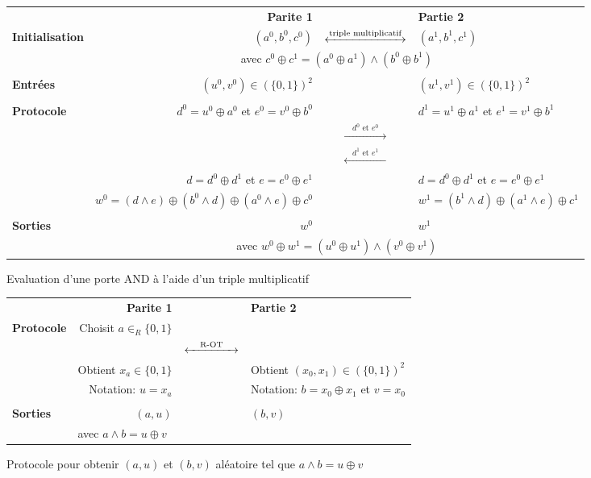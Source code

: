 \documentclass{article}
\begin{document}
\begin{figure}[h]
\centering
\begin{tabular}{|lrcl|}
\hline
 & \textbf{Parite 1} & & \textbf{Partie 2}\\
\textbf{Initialisation} & $(a^0 , b^0 , c^0)$ & $\xleftrightarrow{\text{triple multiplicatif}}$ & $(a^1 , b^1, c^1)$\\
 & \multicolumn{3}{c|}{avec $c^0 \oplus c^1 = (a^0 \oplus a^1) \land (b^0 \oplus b^1)$} \\
 & & & \\
\textbf{Entrées} & $(u^0, v^0) \in (\{0, 1\})^2$ & & $(u^1, v^1) \in (\{0, 1\})^2$ \\
 & & & \\
\textbf{Protocole} & $d^0 = u^0 \oplus a^0$ et $e^0 = v^0 \oplus b^0$ & & $d^1 = u^1 \oplus a^1$ et $e^1 = v^1 \oplus b^1$ \\
 & & $\xrightarrow{\hspace{1em} d^0 \text{ et } e^0 \hspace{1em}}$ & \\
 & & $\xleftarrow{\hspace{1em} d^1 \text{ et } e^1 \hspace{1em}}$ & \\
 & $d = d^0 \oplus d^1$ et $e = e^0 \oplus e^1$ & & $d = d^0 \oplus d^1$ et $e = e^0 \oplus e^1$ \\
 & $w^0 = (d \land e) \oplus (b^0 \land d) \oplus (a^0 \land e) \oplus c^0$ & & $w^1 = (b^1 \land d) \oplus (a^1 \land e) \oplus c^1$ \\
 & & & \\
\textbf{Sorties} & $w^0$ & & $w^1$ \\
& \multicolumn{3}{c|}{avec  $w^0 \oplus w^1 = (u^0 \oplus u^1) \land (v^0 \oplus v^1)$} \\
\hline
\end{tabular}
\captionsetup{labelformat=empty}
\caption{Evaluation d'une porte AND à l'aide d'un triple multiplicatif}
\end{figure}

\begin{figure}[h]
\centering
\begin{tabular}{|lrcl|}
\hline
 & \textbf{Parite 1} & & \textbf{Partie 2}\\
\textbf{Protocole} & Choisit $a \in_R \{0, 1\}$ & & \\
 & & $ \xleftrightarrow{\hspace{1em} \text{R-OT} \hspace{1em}}$ & \\
 & Obtient $x_a \in \{0, 1\}$ & & Obtient $(x_0, x_1) \in (\{0, 1\})^2$  \\
 & Notation: $u= x_a$ & & Notation: $b=x_0 \oplus x_1$ et $v = x_0$ \\
 & & & \\
\textbf{Sorties} & $(a, u)$ & & $(b, v)$ \\
 & \multicolumn{3}{l|}{avec $a \land b = u \oplus v$} \\
\hline
\end{tabular}
\captionsetup{labelformat=empty}
\caption{Protocole pour obtenir $(a, u)$ et $(b, v)$ aléatoire tel que $a \land b = u \oplus v$}
\end{figure}
\end{document}
